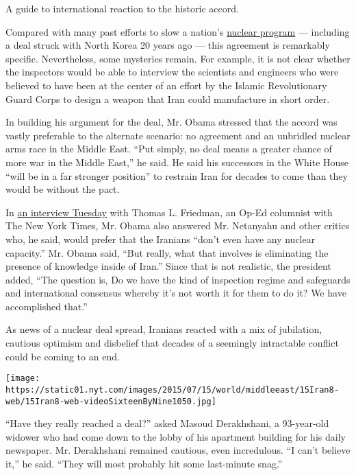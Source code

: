 A guide to international reaction to the historic accord.

Compared with many past efforts to slow a nation's
\href{http://topics.nytimes.com/top/news/international/countriesandterritories/iran/nuclear_program/index.html?inline=nyt-classifier}{nuclear
program} --- including a deal struck with North Korea 20 years ago ---
this agreement is remarkably specific. Nevertheless, some mysteries
remain. For example, it is not clear whether the inspectors would be
able to interview the scientists and engineers who were believed to have
been at the center of an effort by the Islamic Revolutionary Guard Corps
to design a weapon that Iran could manufacture in short order.

In building his argument for the deal, Mr. Obama stressed that the
accord was vastly preferable to the alternate scenario: no agreement and
an unbridled nuclear arms race in the Middle East. ``Put simply, no deal
means a greater chance of more war in the Middle East,'' he said. He
said his successors in the White House ``will be in a far stronger
position'' to restrain Iran for decades to come than they would be
without the pact.

In
\href{http://www.nytimes.com/2015/07/15/opinion/thomas-friedman-obama-makes-his-case-on-iran-nuclear-deal.html?hp\&action=click\&pgtype=Homepage\&module=b-lede-package-region\&region=top-news\&WT.nav=top-news}{an
interview Tuesday} with Thomas L. Friedman, an Op-Ed columnist with The
New York Times, Mr. Obama also answered Mr. Netanyahu and other critics
who, he said, would prefer that the Iranians ``don't even have any
nuclear capacity.'' Mr. Obama said, ``But really, what that involves is
eliminating the presence of knowledge inside of Iran.'' Since that is
not realistic, the president added, ``The question is, Do we have the
kind of inspection regime and safeguards and international consensus
whereby it's not worth it for them to do it? We have accomplished
that.''

As news of a nuclear deal spread, Iranians reacted with a mix of
jubilation, cautious optimism and disbelief that decades of a seemingly
intractable conflict could be coming to an end.

\texttt{[image: https://static01.nyt.com/images/2015/07/15/world/middleeast/15Iran8-web/15Iran8-web-videoSixteenByNine1050.jpg]}

``Have they really reached a deal?'' asked Masoud Derakhshani, a
93-year-old widower who had come down to the lobby of his apartment
building for his daily newspaper. Mr. Derakhshani remained cautious,
even incredulous. ``I can't believe it,'' he said. ``They will most
probably hit some last-minute snag.''

